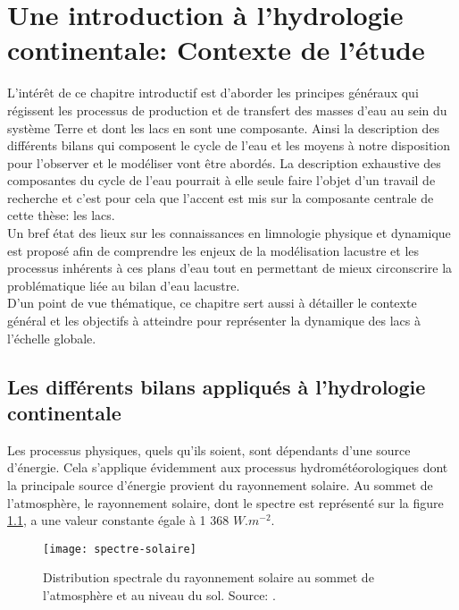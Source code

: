 \chapter{{\selectfont Une introduction à l'hydrologie continentale: Contexte de l'étude}}
\label{chap:intro}
\minitoc

L'intérêt de ce chapitre introductif est d'aborder les principes généraux qui régissent les processus de production et de transfert des masses d'eau au sein du système Terre et dont les lacs en sont une composante. Ainsi la description des différents bilans qui composent le cycle de l'eau et les moyens à notre disposition pour l'observer et le modéliser vont être abordés. La description exhaustive des composantes du cycle de l'eau pourrait à elle seule faire l'objet d'un travail de recherche et c'est pour cela que l'accent est mis sur la composante centrale de cette thèse: les lacs.\\
Un bref état des lieux sur les connaissances en limnologie physique et dynamique est proposé afin de comprendre les enjeux de la modélisation lacustre et les processus inhérents à ces plans d'eau tout en permettant de mieux circonscrire la problématique liée au bilan d'eau lacustre.\\
D'un point de vue thématique, ce chapitre sert aussi à détailler le contexte général et les objectifs à atteindre pour représenter la dynamique des lacs à l'échelle globale.

\section{{\selectfont Les différents bilans appliqués à l'hydrologie continentale}}
\label{sec:intro_bilans}

Les processus physiques, quels qu'ils soient, sont dépendants d'une source d'énergie. Cela s'applique évidemment aux processus hydrométéorologiques dont la principale source d'énergie provient du rayonnement solaire. Au sommet de l'atmosphère, le rayonnement solaire, dont le spectre est représenté sur la figure \ref{ray_solaire}, a une valeur constante égale à 1 368 $W.m^{-2}$.

\begin{figure}[h!]
\centering
 \texttt{[image: spectre-solaire]}
 \caption{Distribution spectrale du rayonnement solaire au sommet de l'atmosphère et au niveau du sol. Source: \citet{malardel2005}.}
 \label{ray_solaire}
\end{figure} 

